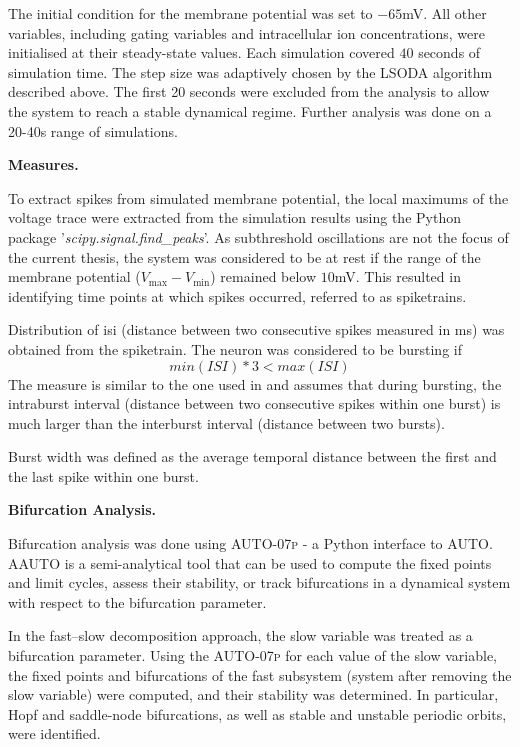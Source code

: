 \documentclass[../main.tex]{subfiles}
\begin{document}
The initial condition for the membrane potential was set to $-65$mV. All other variables, including gating variables and intracellular ion concentrations, were initialised at their steady-state values.
Each simulation covered $40$ seconds of simulation time. The step size was adaptively chosen by the LSODA algorithm described above. The first 20 seconds were excluded from the analysis to allow the system to reach a stable dynamical regime. Further analysis was done on a 20-40s range of simulations.

\vspace*{0.3cm}
\noindent\textbf{Measures.}

To extract spikes from simulated membrane potential, the local maximums of the voltage trace were extracted from the simulation results using the Python package '\textit{scipy.signal.find\_peaks}'. As subthreshold oscillations are not the focus of the current thesis, the system was considered to be at rest if the range of the membrane potential ($V_{\text{max}}-V_{\text{min}}$) remained below $10$mV. This resulted in identifying time points at which spikes occurred, referred to as spiketrains.

Distribution of \gls{isi} (distance between two consecutive spikes measured in ms) was obtained from the spiketrain. The neuron was considered to be bursting if
\begin{equation*}
    min (ISI) * 3 < max(ISI)
\end{equation*}
The measure is similar to the one used in \parencite{franciRobustTunableBursting2018} and assumes that during bursting, the intraburst interval (distance between two consecutive spikes within one burst) is much larger than the interburst interval (distance between two bursts).

Burst width was defined as the average temporal distance between the first and the last spike within one burst.


\vspace*{0.3cm}
\noindent\textbf{Bifurcation Analysis.}

Bifurcation analysis was done using \textsc{AUTO-07p} \parencite{article} - a Python interface to AUTO. AAUTO is a semi-analytical tool that can be used to compute the fixed points and limit cycles, assess their stability, or track bifurcations in a dynamical system with respect to the bifurcation parameter.

In the fast–slow decomposition approach, the slow variable was treated as a bifurcation parameter.
Using the \textsc{AUTO-07p} for each value of the slow variable, the fixed points and bifurcations of the fast subsystem (system after removing the slow variable) were computed, and their stability was determined. In particular, Hopf and saddle-node bifurcations, as well as stable and unstable periodic orbits, were identified.
\end{document}
